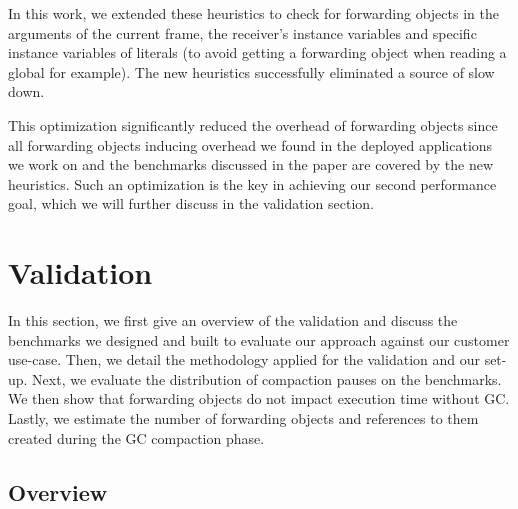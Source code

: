 \documentclass[sigplan,10pt,review,anonymous]{acmart}\settopmatter{printfolios=true,printccs=false,printacmref=false}
\newcommand{\egb}[1]{\color{blue}\fbox{\bfseries\sffamily\scriptsize Elisa:}{\sf\small$\blacktriangleright$\textit{#1}$\blacktriangleleft$}\color{black}}
\begin{document}
In this work, we extended these heuristics to check for forwarding objects in the arguments of the current frame, the receiver's instance variables and specific instance variables of literals (to avoid getting a forwarding object when reading a global for example). The new heuristics successfully eliminated a source of slow down.

This optimization significantly reduced the overhead of forwarding objects since all forwarding objects inducing overhead we found in the deployed applications we work on and the benchmarks discussed in the paper are covered by the new heuristics.
Such an optimization is the key in achieving our second performance goal, which we will further discuss in the validation section.

\section{Validation}
\label{sec:validation}

In this section, we first give an overview of the validation and discuss the benchmarks we designed and built to evaluate our approach against our customer use-case. Then, we detail the methodology applied for the validation and our set-up. Next, we evaluate the distribution of compaction pauses on the benchmarks. We then show that forwarding objects do not impact execution time without GC. Lastly, we estimate the number of forwarding objects and references to them created during the GC compaction phase.

\subsection{Overview}
\label{sec:ow}
\end{document}
